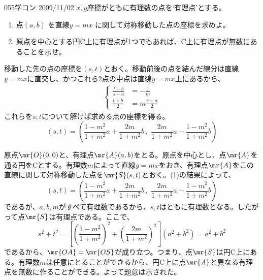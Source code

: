 \begin{prob}{055}{}{学コン 2009/11/02}
 $x,y$座標がともに有理数の点を`有理点'とする。
 \begin{enumerate}
  \item 点$(a,b)$ を直線$y=mx$ に関して対称移動した点の座標を求めよ。
  \item 原点を中心とする円C上に有理点が1つでもあれば、C上に有理点が無数にあることを示せ。
 \end{enumerate}
\end{prob}

移動した先の点の座標を$(s, t)$とおく。移動前後の点を結んだ線分は直線$y=mx$に直交し、かつこれら2点の中点は直線$y=mx$上にあるから、
\begin{align*}
 \left\{
 \begin{aligned}
  \frac{t-b}{s-a}&=-\frac{1}{m} \\
  \frac{t+b}{2}&=m\frac{s+a}{2}
 \end{aligned}\right.
\end{align*}
これらを$s, t$について解けば求める点の座標を得る。
\[ (s, t) = \left( \frac{1-m^2}{1+m^2}a+\frac{2m}{1+m^2}b \,,\,\, \frac{2m}{1+m^2}a-\frac{1-m^2}{1+m^2}b \right) \]

原点$\mr{O}(0,0)$と、有理点$\mr{A}(a, b)$をとる。原点を中心とし、点$\mr{A}$を通る円をCとする。有理数$m$によって直線$y=mx$をおき、有理点$\mr{A}$をこの直線に関して対称移動した点を$\mr{S}(s, t)$とおく。(1)の結果によって、
\[ (s, t) = \left( \frac{1-m^2}{1+m^2}a+\frac{2m}{1+m^2}b \,,\,\, \frac{2m}{1+m^2}a-\frac{1-m^2}{1+m^2}b \right) \]
であるが、$a, b, m$がすべて有理数であるから、$s, t$はともに有理数となる。したがって点$\mr{S}$は有理点である。ここで、
\[ s^2+t^2=\left[\left(\frac{1-m^2}{1+m^2}\right)^2+\left(\frac{2m}{1+m^2}\right)^2\right](a^2+b^2)=a^2+b^2 \]
であるから、$\mr{OA}=\mr{OS}$が成り立つ。つまり、点$\mr{S}$は円C上にある。有理数$m$は任意にとることができるから、円C上に点$\mr{A}$と異なる有理点を無数に作ることができる。よって題意は示された。